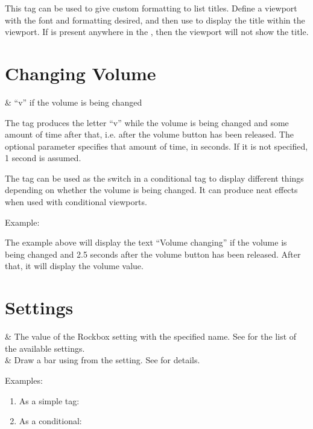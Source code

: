   This tag can be used to give custom formatting to list titles.
  Define a viewport with the font and formatting desired, and then use
   to display the title within the
  viewport.  If  is present anywhere in the , then the
   viewport will not show the title.

\section{Changing Volume}
  \begin{tagmap}
     & ``v'' if the volume is being changed\\
  \end{tagmap}

The tag produces the letter ``v'' while the volume is being changed and some
amount of time after that, i.e. after the volume button has been released. The
optional parameter  specifies that amount of time, in seconds. If it
is not specified, 1 second is assumed.

The tag can be used as the switch in a conditional tag to display different things
depending on whether the volume is being changed. It can produce neat effects
when used with conditional viewports.

Example: 

The example above will display the text ``Volume changing'' if the volume is
being changed and 2.5 seconds after the volume button has been released. After
that, it will display the volume value.

\section{Settings}
  \begin{tagmap}
     & The value of the Rockbox
             setting with the specified name. See 
             for the list of the available settings.\\
     & Draw a bar using from the setting.
            See  for details.\\
  \end{tagmap}

Examples:
\begin{enumerate}
\item As a simple tag: 
\item As a conditional: 
\end{enumerate}


